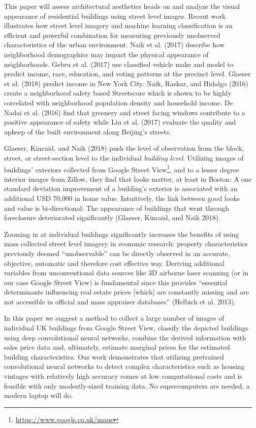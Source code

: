\documentclass[]{article}
\let\rmarkdownfootnote\footnote%
\def\footnote{\protect\rmarkdownfootnote}
\begin{document}
This paper will assess architectural aesthetics heads on and analyze the
visual appearance of residential buildings using street level images.
Recent work illustrates how street level imagery and machine learning
classification is an efficient and powerful combination for measuring
previously unobserved characteristics of the urban environment. Naik et
al. (2017) describe how neighborhood demographics may impact the
physical appearance of neighborhoods. Gebru et al. (2017) use classified
vehicle make and model to predict income, race, education, and voting
patterns at the precinct level. Glaeser et al. (2018) predict income in
New York City. Naik, Raskar, and Hidalgo (2016) create a neighborhood
safety based Streetscore which is shown to be highly correlated with
neighborhood population density and household income. De Nadai et al.
(2016) find that greenery and street facing windows contribute to a
positive appearance of safety while Liu et al. (2017) evaluate the
quality and upkeep of the built environment along Beijing's streets.

Glaeser, Kincaid, and Naik (2018) push the level of observation from the
block, street, or street-section level to the individual
\emph{building level}. Utilizing images of buildings' exteriors
collected from Google Street
View\footnote{\href{https://www.google.co.uk/maps}{https://www.google.co.uk/maps}},
and to a lesser degree interior images from Zillow, they find that looks
matter, at least in Boston: A one standard deviation improvement of a
building's exterior is associated with an additional USD 70,000 in home
value. Intuitively, the link between good looks and value is
bi-directional: The appearance of buildings that went through
foreclosure deteriorated significantly (Glaeser, Kincaid, and Naik
2018).

Zooming in at individual buildings significantly increases the benefits
of using mass collected street level imagery in economic research:
property characteristics previously deemed ``unobservable'' can be
directly observed in an accurate, objective, automatic and therefore
cost effective way. Deriving additional variables from unconventional
data sources like 3D airborne laser scanning (or in our case Google
Street View) is fundamental since this provides ``essential determinants
influencing real estate prices {[}which{]} are constantly missing and
are not accessible in official and mass appraiser databases'' (Helbich
et al. 2013).

In this paper we suggest a method to collect a large number of images of
individual UK buildings from Google Street View, classify the depicted
buildings using deep convolutional neural networks, combine the derived
information with sales price data and, ultimately, estimate marginal
prices for the estimated building characteristics. Our work demonstrates
that utilizing pretrained convolutional neural networks to detect
complex characteristics such as housing vintages with relatively high
accuracy comes at low computational costs and is feasible with only
modestly-sized training data. No supercomputers are needed, a modern
laptop will do.
\end{document}
